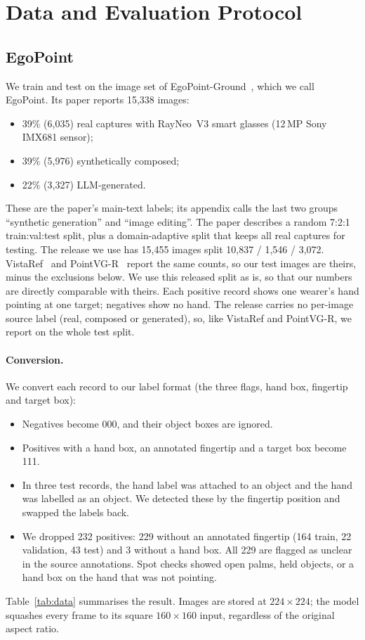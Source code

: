 \section{Data and Evaluation Protocol}\label{sec:data}

\subsection{EgoPoint}
We train and test on the image set of EgoPoint-Ground~\cite{egopoint}, which we call EgoPoint. Its paper reports 15,338 images:
\begin{itemize}
\item 39\% (6,035) real captures with RayNeo~V3 smart glasses (12\,MP Sony IMX681 sensor);
\item 39\% (5,976) synthetically composed;
\item 22\% (3,327) LLM-generated.
\end{itemize}
These are the paper's main-text labels; its appendix calls the last two groups ``synthetic generation'' and ``image editing''. The paper describes a random 7:2:1 train:val:test split, plus a domain-adaptive split that keeps all real captures for testing. The release we use has 15,455 images split 10,837 / 1,546 / 3,072. VistaRef~\cite{li2026vistaref} and PointVG-R~\cite{li2026pointvgr} report the same counts, so our test images are theirs, minus the exclusions below. We use this released split as is, so that our numbers are directly comparable with theirs. Each positive record shows one wearer's hand pointing at one target; negatives show no hand. The release carries no per-image source label (real, composed or generated), so, like VistaRef and PointVG-R, we report on the whole test split.

\paragraph{Conversion.} We convert each record to our label format (the three flags, hand box, fingertip and target box):
\begin{itemize}
\item Negatives become 000, and their object boxes are ignored.
\item Positives with a hand box, an annotated fingertip and a target box become 111.
\item In three test records, the hand label was attached to an object and the hand was labelled as an object. We detected these by the fingertip position and swapped the labels back.
\item We dropped 232 positives: 229 without an annotated fingertip (164 train, 22 validation, 43 test) and 3 without a hand box. All 229 are flagged as unclear in the source annotations. Spot checks showed open palms, held objects, or a hand box on the hand that was not pointing.
\end{itemize}
Table~\ref{tab:data} summarises the result. Images are stored at $224\times224$; the model squashes every frame to its square $160\times160$ input, regardless of the original aspect ratio.

